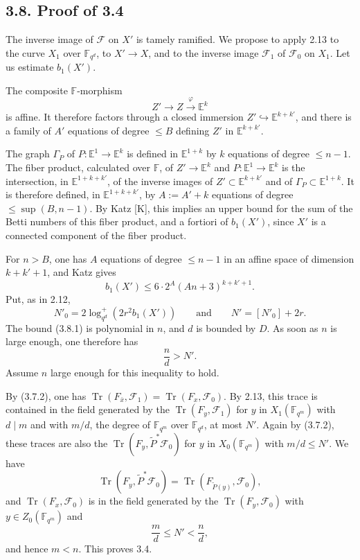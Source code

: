 \documentclass[10pt]{article}
\newcommand{\F}{\mathbb{F}}
\newcommand{\Tr}{\operatorname{Tr}}
\begin{document}
\subsection*{3.8. Proof of 3.4}
The inverse image of $\mathcal F$ on $X'$ is tamely ramified.
We propose to apply 2.13 to the curve $X_1$ over $\F_{q^d}$, to $X'\to X$, and to the inverse image $\mathcal F_1$ of $\mathcal F_0$ on $X_1$.
Let us estimate $b_1(X')$.

The composite $\F$-morphism
\[
 Z'\to Z\xrightarrow{\varphi}\mathbb E^k
\]
is affine.
It therefore factors through a closed immersion $Z'\hookrightarrow\mathbb E^{k+k'}$, and there is a family of $A'$ equations of degree $\le B$ defining $Z'$ in $\mathbb E^{k+k'}$.

The graph $\Gamma_P$ of $P:\mathbb E^1\to\mathbb E^k$ is defined in $\mathbb E^{1+k}$ by $k$ equations of degree $\le n-1$.
The fiber product, calculated over $\F$, of $Z'\to\mathbb E^k$ and $P:\mathbb E^1\to\mathbb E^k$ is the intersection, in $\mathbb E^{1+k+k'}$, of the inverse images of $Z'\subset\mathbb E^{k+k'}$ and of $\Gamma_P\subset\mathbb E^{1+k}$.
It is therefore defined, in $\mathbb E^{1+k+k'}$, by $A:=A'+k$ equations of degree $\le\sup(B,n-1)$.
By Katz [K], this implies an upper bound for the sum of the Betti numbers of this fiber product, and a fortiori of $b_1(X')$, since $X'$ is a connected component of the fiber product.

For $n>B$, one has $A$ equations of degree $\le n-1$ in an affine space of dimension $k+k'+1$, and Katz gives
\begin{equation}
 b_1(X')\le 6\cdot 2^A(An+3)^{k+k'+1}.
\tag{3.8.1}
\end{equation}
Put, as in 2.12,
\[
 N'_0=2\log_{q^d}^+(2r^2b_1(X'))\qquad\text{and}\qquad
 N'=[N'_0]+2r.
\]
The bound (3.8.1) is polynomial in $n$, and $d$ is bounded by $D$.
As soon as $n$ is large enough, one therefore has
\[
 \frac nd>N'.
\]
Assume $n$ large enough for this inequality to hold.

By (3.7.2), one has $\Tr(F_{\bar x},\mathcal F_1)=\Tr(F_x,\mathcal F_0)$.
By 2.13, this trace is contained in the field generated by the $\Tr(F_y,\mathcal F_1)$ for $y$ in $X_1(\F_{q^m})$ with $d\mid m$ and with $m/d$, the degree of $\F_{q^m}$ over $\F_{q^d}$, at most $N'$.
Again by (3.7.2), these traces are also the $\Tr(F_y,\widetilde P^*\mathcal F_0)$ for $y$ in $X_0(\F_{q^m})$ with $m/d\le N'$.
We have
\[
 \Tr(F_y,\widetilde P^*\mathcal F_0)=\Tr(F_{\widetilde P(y)},\mathcal F_0),
\]
and $\Tr(F_x,\mathcal F_0)$ is in the field generated by the $\Tr(F_y,\mathcal F_0)$ with $y\in Z_0(\F_{q^m})$ and
\[
 \frac md\le N'<\frac nd,
\]
and hence $m<n$.
This proves 3.4.
\end{document}
